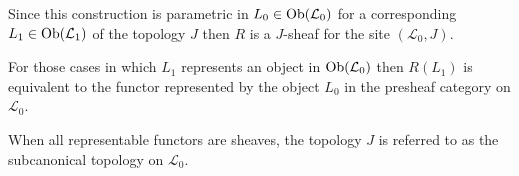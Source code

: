 \begin{frame}
\begin{block}{}
Since this construction is parametric in $L_0 \in \mathop{\rm Ob}\nolimits(\mathcal{L}_0)$ for a corresponding $L_1 \in \mathop{\rm Ob}\nolimits(\mathcal{L}_1)$ of the topology $J$ then $R$ is a $J$-sheaf for the site $(\mathcal{L}_0,J)$. 
\end{block}
\begin{block}{}
For those cases in which $L_1$ represents an object in $\mathop{\rm Ob}\nolimits(\mathcal{L}_0)$ then $R(L_1)$ is equivalent to the functor represented by the object $L_0$ in the presheaf category on $\mathcal{L}_0$. 
\end{block}
\begin{block}{}
When all representable functors are sheaves, the topology $J$ is referred to as the subcanonical topology on $\mathcal{L}_0$.
\end{block}
\end{frame}